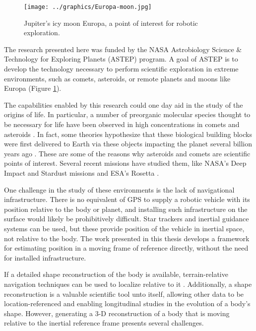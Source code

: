 \begin{figure}[htb]
   \centering
   \texttt{[image: ../graphics/Europa-moon.jpg]} %
   \caption{Jupiter's icy moon Europa, a point of interest for robotic exploration.}
   \label{fig:Europa}
\end{figure}

The research presented here was funded by the NASA Astrobiology Science \& Technology for Exploring Planets (ASTEP) program. A goal of ASTEP is to develop the technology necessary to perform scientific  exploration in extreme environments, such as comets, asteroids, or remote planets and moons like Europa (Figure \ref{fig:Europa}).

The capabilities enabled by this research could one day aid in the study of the origins of life. In particular, a number of preorganic molecular species thought to be necessary for life have been observed in high concentrations in comets and asteroids \cite{Fomenkova1999}. In fact, some theories hypothesize that these biological building blocks were first delivered to Earth via these objects impacting the planet several billion years ago \cite{Chyba1992}. These are some of the reasons why asteroids and comets are scientific points of interest. Several recent missions have studied them, like NASA's Deep Impact and Stardust missions\cite{Ahearn2005,Willcockson1999} and ESA's Rosetta \cite{Bibring2007}.

One challenge in the study of these environments is the lack of navigational infrastructure. There is no equivalent of GPS to supply a robotic vehicle with its position relative to the body or planet, and installing such infrastructure on the surface would likely be prohibitively difficult. Star trackers and inertial guidance systems can be used, but these provide position of the vehicle in inertial space, not relative to the body. The work presented in this thesis develops a framework for estimating position in a moving frame of reference directly, without the need for installed infrastructure.

If a detailed shape reconstruction of the body is available, terrain-relative navigation techniques can be used to localize relative to it \cite{Anonsen2006,Anonsen2007}. Additionally, a shape reconstruction is a valuable scientific tool unto itself, allowing other data to be location-referenced and enabling longitudinal studies in the evolution of a body's shape. However, generating a 3-D reconstruction of a body that is moving relative to the inertial reference frame presents several challenges.

